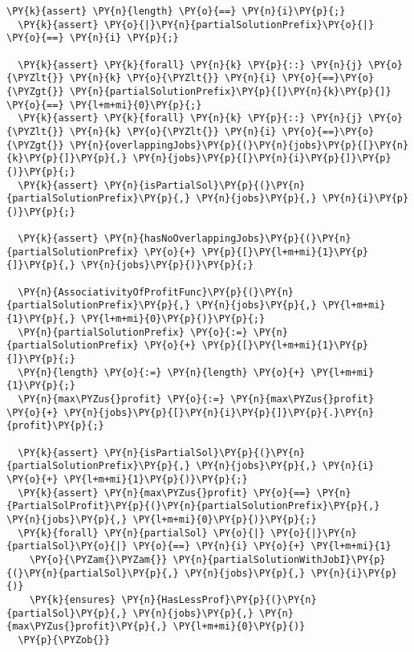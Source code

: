 \begin{footnotesize}
\begin{Verbatim}[commandchars=\\\{\}, fontsize=\footnotesize]
  \PY{k}{assert} \PY{n}{length} \PY{o}{==} \PY{n}{i}\PY{p}{;}
  \PY{k}{assert} \PY{o}{|}\PY{n}{partialSolutionPrefix}\PY{o}{|} \PY{o}{==} \PY{n}{i} \PY{p}{;}

  \PY{k}{assert} \PY{k}{forall} \PY{n}{k} \PY{p}{::} \PY{n}{j} \PY{o}{\PYZlt{}} \PY{n}{k} \PY{o}{\PYZlt{}} \PY{n}{i} \PY{o}{==}\PY{o}{\PYZgt{}} \PY{n}{partialSolutionPrefix}\PY{p}{[}\PY{n}{k}\PY{p}{]} \PY{o}{==} \PY{l+m+mi}{0}\PY{p}{;}
  \PY{k}{assert} \PY{k}{forall} \PY{n}{k} \PY{p}{::} \PY{n}{j} \PY{o}{\PYZlt{}} \PY{n}{k} \PY{o}{\PYZlt{}} \PY{n}{i} \PY{o}{==}\PY{o}{\PYZgt{}} \PY{n}{overlappingJobs}\PY{p}{(}\PY{n}{jobs}\PY{p}{[}\PY{n}{k}\PY{p}{]}\PY{p}{,} \PY{n}{jobs}\PY{p}{[}\PY{n}{i}\PY{p}{]}\PY{p}{)}\PY{p}{;} 
  \PY{k}{assert} \PY{n}{isPartialSol}\PY{p}{(}\PY{n}{partialSolutionPrefix}\PY{p}{,} \PY{n}{jobs}\PY{p}{,} \PY{n}{i}\PY{p}{)}\PY{p}{;}

  \PY{k}{assert} \PY{n}{hasNoOverlappingJobs}\PY{p}{(}\PY{n}{partialSolutionPrefix} \PY{o}{+} \PY{p}{[}\PY{l+m+mi}{1}\PY{p}{]}\PY{p}{,} \PY{n}{jobs}\PY{p}{)}\PY{p}{;} 

  \PY{n}{AssociativityOfProfitFunc}\PY{p}{(}\PY{n}{partialSolutionPrefix}\PY{p}{,} \PY{n}{jobs}\PY{p}{,} \PY{l+m+mi}{1}\PY{p}{,} \PY{l+m+mi}{0}\PY{p}{)}\PY{p}{;} 
  \PY{n}{partialSolutionPrefix} \PY{o}{:=} \PY{n}{partialSolutionPrefix} \PY{o}{+} \PY{p}{[}\PY{l+m+mi}{1}\PY{p}{]}\PY{p}{;}
  \PY{n}{length} \PY{o}{:=} \PY{n}{length} \PY{o}{+} \PY{l+m+mi}{1}\PY{p}{;}
  \PY{n}{max\PYZus{}profit} \PY{o}{:=} \PY{n}{max\PYZus{}profit} \PY{o}{+} \PY{n}{jobs}\PY{p}{[}\PY{n}{i}\PY{p}{]}\PY{p}{.}\PY{n}{profit}\PY{p}{;}

  \PY{k}{assert} \PY{n}{isPartialSol}\PY{p}{(}\PY{n}{partialSolutionPrefix}\PY{p}{,} \PY{n}{jobs}\PY{p}{,} \PY{n}{i} \PY{o}{+} \PY{l+m+mi}{1}\PY{p}{)}\PY{p}{;}
  \PY{k}{assert} \PY{n}{max\PYZus{}profit} \PY{o}{==} \PY{n}{PartialSolProfit}\PY{p}{(}\PY{n}{partialSolutionPrefix}\PY{p}{,} \PY{n}{jobs}\PY{p}{,} \PY{l+m+mi}{0}\PY{p}{)}\PY{p}{;}
  \PY{k}{forall} \PY{n}{partialSol} \PY{o}{|} \PY{o}{|}\PY{n}{partialSol}\PY{o}{|} \PY{o}{==} \PY{n}{i} \PY{o}{+} \PY{l+m+mi}{1} 
    \PY{o}{\PYZam{}\PYZam{}} \PY{n}{partialSolutionWithJobI}\PY{p}{(}\PY{n}{partialSol}\PY{p}{,} \PY{n}{jobs}\PY{p}{,} \PY{n}{i}\PY{p}{)}
    \PY{k}{ensures} \PY{n}{HasLessProf}\PY{p}{(}\PY{n}{partialSol}\PY{p}{,} \PY{n}{jobs}\PY{p}{,} \PY{n}{max\PYZus{}profit}\PY{p}{,} \PY{l+m+mi}{0}\PY{p}{)}
  \PY{p}{\PYZob{}}
   

\end{Verbatim}
\end{footnotesize}
